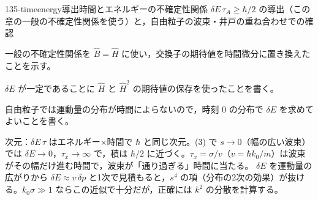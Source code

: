 \documentclass[uplatex,dvipdfmx,a4paper,11pt]{jsarticle}
\begin{document}
\begin{mondai}{135-timeenergy}{導出}{時間とエネルギーの不確定性関係 $\delta E\,\tau_{A}\ge\hbar/2$ の導出（この章の一般の不確定性関係を使う）と，自由粒子の波束・井戸の重ね合わせでの確認}
\begin{tadashii}
\begin{ronten}
  \item {} 一般の不確定性関係を $\hat{B}=\hat{H}$ に使い，交換子の期待値を時間微分に置き換えたことを示す。
  \item {} $\delta E$ が一定であることに $\hat{H}$ と $\hat{H}^{2}$ の期待値の保存を使ったことを書く。
  \item {} 自由粒子では運動量の分布が時間によらないので，時刻 $0$ の分布で $\delta E$ を求めてよいことを書く。
\end{ronten}
\kenzan 次元：$\delta E\,\tau$ はエネルギー×時間で $\hbar$ と同じ次元。(3) で $s\to0$（幅の広い波束）では $\delta E\to0$，$\tau_{x}\to\infty$ で，積は $\hbar/2$ に近づく。$\tau_{x}=\sigma/v$（$v=\hbar k_{0}/m$）は波束がその幅だけ進む時間で，波束が「通り過ぎる」時間に当たる。
\tsumazuki $\delta E$ を運動量の広がりから $\delta E\approx v\,\delta p$ と1次で見積もると，$s^{4}$ の項（分布の2次の効果）が抜ける。$k_{0}\sigma\gg1$ ならこの近似で十分だが，正確には $k^{2}$ の分散を計算する。
\end{tadashii}
\end{mondai}

\noteowari
\end{document}
